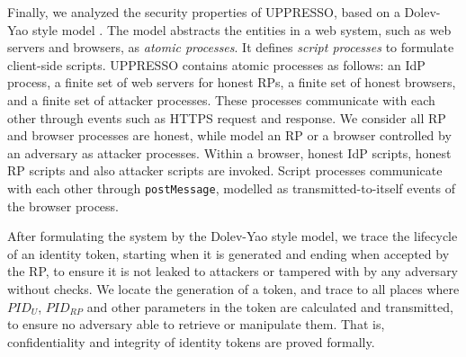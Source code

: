 

Finally, we analyzed the security properties of UPPRESSO, %
     based on a Dolev-Yao style model \cite{SPRESSO}.
The model abstracts the entities in a web system,
    such as web servers and browsers,
    as \emph{atomic processes}. %
It defines \emph{script processes} to formulate client-side scripts.
%
%
%
%
UPPRESSO contains atomic processes as follows:
an IdP process,
    a finite set of web servers for honest RPs, a finite set of honest browsers, and a finite set of attacker processes.
These processes communicate with each other through events such as HTTPS request and response.
We consider all RP and browser processes are honest,
 while model an RP or a browser controlled by an adversary as attacker processes.
Within a browser,
 honest IdP scripts, honest RP scripts and also attacker scripts are invoked.
Script processes communicate with each other through \verb+postMessage+,
    modelled as transmitted-to-itself events of the browser process.


After formulating the system by the Dolev-Yao style model,
    we trace the lifecycle of an identity token,
        starting when it is generated and ending when accepted by the RP,
 to ensure it is not leaked to attackers or tampered with by any adversary without checks.
We locate the generation of a token, and trace to all places
    where $PID_U$, $PID_{RP}$ and other parameters in the token are calculated and transmitted,
     to ensure no adversary able to retrieve or manipulate them.
That is, confidentiality and integrity of identity tokens are proved formally.


